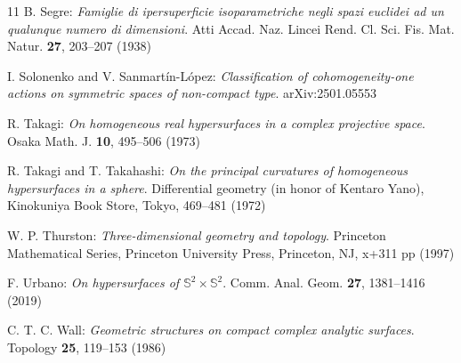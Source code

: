 \documentclass[reqno]{amsart}%
\theoremstyle{definition}
\numberwithin{equation}{section}
\begin{document}
\begin{thebibliography}{11}
		B. Segre:
		{\it Famiglie di ipersuperficie isoparametriche negli spazi euclidei ad un qualunque numero
			di dimensioni}.
		Atti Accad. Naz. Lincei Rend. Cl. Sci. Fis. Mat. Natur. {\bf 27}, 203--207 (1938)
		
		I. Solonenko and V. Sanmart\'{i}n-L\'{o}pez:
		{\it Classification of cohomogeneity-one actions on symmetric spaces of non-compact type}.
		arXiv:2501.05553
		
		R. Takagi:
		{\it On homogeneous real hypersurfaces in a complex projective space}.
		Osaka Math. J. {\bf 10}, 495--506 (1973)
		
		R. Takagi and T. Takahashi:
		{\it On the principal curvatures of homogeneous hypersurfaces in a sphere}.
		Differential geometry (in honor of Kentaro Yano), Kinokuniya Book Store, Tokyo,
		469--481 (1972)
		
		W. P. Thurston:
		{\it Three-dimensional geometry and topology}.
		Princeton Mathematical Series, Princeton University Press, Princeton, NJ, x+311 pp (1997)
		
		F. Urbano:
		{\it On hypersurfaces of $\mathbb{S}^2\times\mathbb{S}^2$}.
		Comm. Anal. Geom. {\bf 27}, 1381--1416 (2019)
		
		C. T. C. Wall:
		{\it Geometric structures on compact complex analytic surfaces}.
		Topology {\bf 25}, 119--153 (1986)
		
	\end{thebibliography}
	
\end{document}
